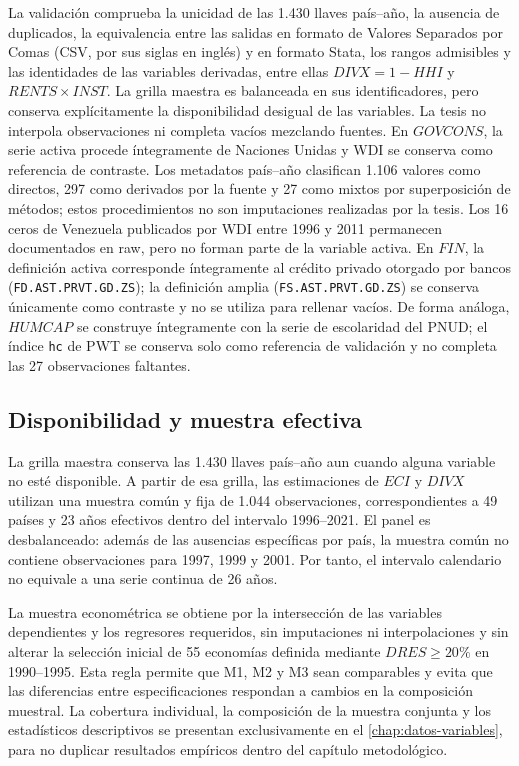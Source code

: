 \documentclass[../../TFM.tex]{subfiles}
\begin{document}
	La validación comprueba la unicidad de las 1.430 llaves país--año, la
	ausencia de duplicados, la equivalencia entre las salidas en formato de
	Valores Separados por Comas (CSV, por sus siglas en inglés) y en formato
	Stata, los
	rangos admisibles y las identidades de las variables derivadas, entre ellas
	$DIVX=1-HHI$ y $RENTS\times INST$. La grilla maestra es balanceada en sus
	identificadores, pero conserva explícitamente la disponibilidad desigual de
	las variables. La tesis no interpola observaciones ni completa vacíos
	mezclando fuentes. En $GOVCONS$, la serie activa procede íntegramente de
	Naciones Unidas y WDI se conserva como referencia de contraste. Los
	metadatos país--año clasifican 1.106 valores como directos, 297 como
	derivados por la fuente y 27 como mixtos por superposición de métodos; estos
	procedimientos no son imputaciones realizadas por la tesis. Los 16 ceros de
	Venezuela publicados por WDI entre 1996 y 2011 permanecen documentados en
	raw, pero no forman parte de la variable activa. En $FIN$, la definición
	activa corresponde íntegramente al crédito privado otorgado por bancos
	(\texttt{FD.AST.PRVT.GD.ZS}); la definición amplia
	(\texttt{FS.AST.PRVT.GD.ZS}) se conserva únicamente como contraste y no se
	utiliza para rellenar vacíos. De forma análoga, $HUMCAP$ se construye
	íntegramente con la serie de escolaridad del PNUD; el índice \texttt{hc} de
	PWT se conserva solo como referencia de validación y no completa las 27
	observaciones faltantes.

	\subsection{Disponibilidad y muestra efectiva}
	\label{subsec:cobertura-panel-maestro}

	La grilla maestra conserva las 1.430 llaves país--año aun cuando alguna
	variable no esté disponible. A partir de esa grilla, las estimaciones de
	$ECI$ y $DIVX$ utilizan una muestra común y fija de 1.044 observaciones,
	correspondientes a 49 países y 23 años efectivos dentro del intervalo
	1996--2021. El panel es desbalanceado: además de las ausencias específicas por
	país, la muestra común no contiene observaciones para 1997, 1999 y 2001. Por
	tanto, el intervalo calendario no equivale a una serie continua de 26 años.

	La muestra econométrica se obtiene por la intersección de las variables
	dependientes y los regresores requeridos, sin imputaciones ni interpolaciones
	y sin alterar la selección inicial de 55 economías definida mediante
	$DRES\geq20\%$ en 1990--1995. Esta regla permite que M1, M2 y M3 sean
	comparables y evita que las diferencias entre especificaciones respondan a
	cambios en la composición muestral.
	La cobertura individual, la composición de la muestra conjunta y los
	estadísticos descriptivos se presentan exclusivamente en el
	\autoref{chap:datos-variables}, para no duplicar resultados empíricos dentro
	del capítulo metodológico.
\end{document}
